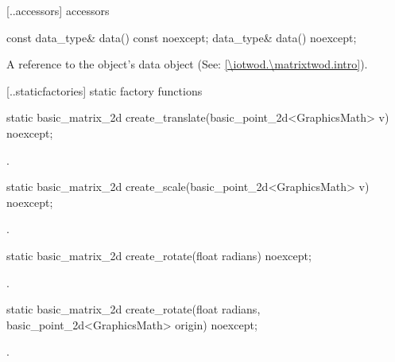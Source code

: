  [\iotwod.\matrixtwod.accessors] { accessors}

%
\begin{itemdecl}
const data_type& data() const noexcept;
data_type& data() noexcept;
\end{itemdecl}
\begin{itemdescr}
\pnum
\returns
A reference to the  object's data object (See: \ref{\iotwod.\matrixtwod.intro}).
\end{itemdescr}

 [\iotwod.\matrixtwod.staticfactories] { static factory 
functions}

%
\begin{itemdecl}
static basic_matrix_2d create_translate(basic_point_2d<GraphicsMath> v) noexcept;
\end{itemdecl}
\begin{itemdescr}
\pnum
\returns
{}.
\end{itemdescr}

%
\begin{itemdecl}
static basic_matrix_2d create_scale(basic_point_2d<GraphicsMath> v) noexcept;
\end{itemdecl}
\begin{itemdescr}
\pnum
\returns
{}.
\end{itemdescr}

%
\begin{itemdecl}
static basic_matrix_2d create_rotate(float radians) noexcept;
\end{itemdecl}
\begin{itemdescr}
\pnum
\returns
{}.
\end{itemdescr}

%
\begin{itemdecl}
static basic_matrix_2d create_rotate(float radians, basic_point_2d<GraphicsMath> origin) noexcept;
\end{itemdecl}
\begin{itemdescr}
\pnum
\returns
{}.
\end{itemdescr}

